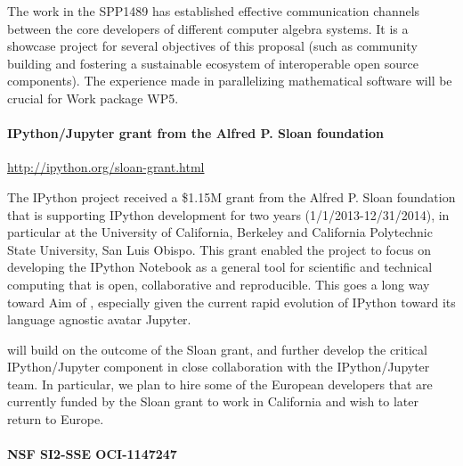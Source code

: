 The work in the SPP1489 has established effective communication channels between 
the core developers of different computer algebra systems. It is a showcase project
for several objectives of this proposal (such as community building and
fostering a sustainable ecosystem of interoperable open source components). 
The experience made in parallelizing mathematical software will be crucial for
Work package WP5.


\paragraph{IPython/Jupyter grant from the Alfred P. Sloan foundation}
\url{http://ipython.org/sloan-grant.html}

The IPython project received a \$1.15M grant from the Alfred P. Sloan%
foundation that is supporting IPython development for two years
(1/1/2013-12/31/2014), in particular at the University of California,
Berkeley and California Polytechnic State University, San Luis Obispo.
This grant enabled the project to focus on developing the IPython
Notebook as a general tool for scientific and technical computing that
is open, collaborative and reproducible. This goes a long way toward
Aim  of \TheProject, especially given the current
rapid evolution of IPython toward its language agnostic avatar
Jupyter.

\TheProject will build on the outcome of the Sloan grant, and further
develop the critical IPython/Jupyter component in close collaboration
with the IPython/Jupyter team. In particular, we plan to hire some of
the European developers that are currently funded by the Sloan grant
to work in California and wish to later return to Europe.

\paragraph{NSF SI2-SSE OCI-1147247}


